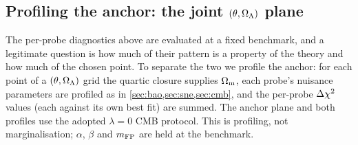 \subsection[Profiling the anchor: the joint (theta, Omega Lambda) plane]{Profiling the anchor: the joint \texorpdfstring{$(\theta,\Omega_{\Lambda})$}{(theta, Omega_Lambda)} plane}\label{sec:anchor}
The per-probe diagnostics above are evaluated at a fixed benchmark, and a legitimate question is how much of their pattern is a property of the theory and how much of the chosen point. To separate the two we profile the anchor: for each point of a $(\theta,\Omega_{\Lambda})$ grid the quartic closure supplies $\Omega_{\mathrm m}$, each probe's nuisance parameters are profiled as in \cref{sec:bao,sec:sne,sec:cmb}, and the per-probe $\Delta\chi^2$ values (each against its own \LCDM{} best fit) are summed. The anchor plane and both profiles use the adopted $\lambda=0$ CMB protocol. This is profiling, not marginalisation; $\alpha$, $\beta$ and $m_{\mathrm{FP}}$ are held at the benchmark.

